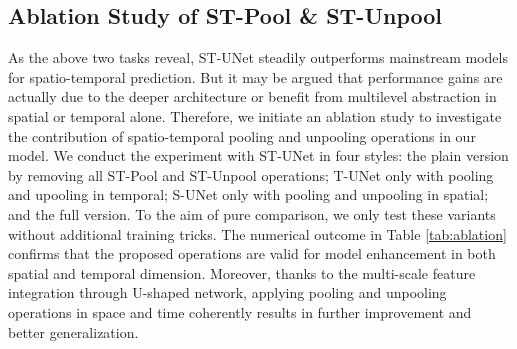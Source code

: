 \documentclass[sigconf,screen]{acmart}
\begin{document}
\subsection{Ablation Study of ST-Pool \& ST-Unpool}
As the above two tasks reveal, ST-UNet steadily outperforms mainstream models for spatio-temporal prediction. But it may be argued that performance gains are actually due to the deeper architecture or benefit from multilevel abstraction in spatial or temporal alone. Therefore, we initiate an ablation study to investigate the contribution of spatio-temporal pooling and unpooling operations in our model. We conduct the experiment with ST-UNet in four styles: the plain version by removing all ST-Pool and ST-Unpool operations; T-UNet only with pooling and upooling in temporal; S-UNet only with pooling and unpooling in spatial; and the full version. To the aim of pure comparison, we only test these variants without additional training tricks. The numerical outcome in Table \ref{tab:ablation} confirms that the proposed operations are valid for model enhancement in both spatial and temporal dimension. Moreover, thanks to the multi-scale feature integration through U-shaped network, applying pooling and unpooling operations in space and time coherently results in further improvement and better generalization. 
\end{document}
